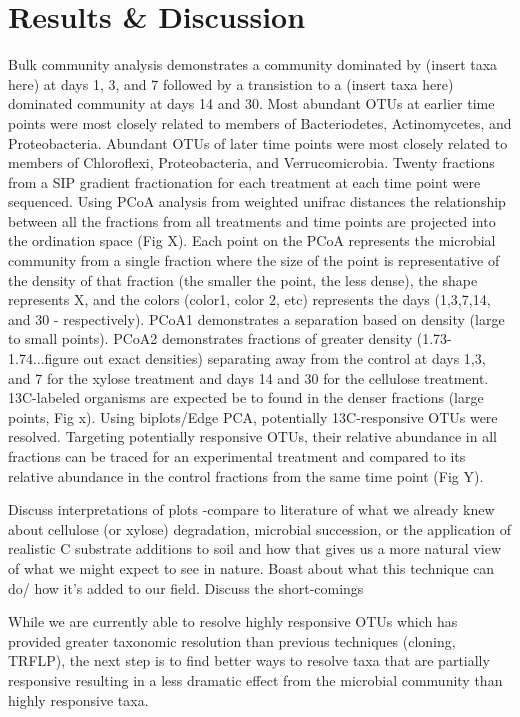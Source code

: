 \section{Results & Discussion}


Bulk community analysis demonstrates a community dominated by (insert taxa here) at days 1, 3, and 7 followed by a transistion to a (insert taxa here) dominated community at days 14 and 30. Most abundant OTUs at earlier time points were most closely related to members of Bacteriodetes, Actinomycetes, and Proteobacteria. Abundant OTUs of later time points were most closely related to members of Chloroflexi, Proteobacteria, and Verrucomicrobia. Twenty fractions from a SIP gradient fractionation for each treatment at each time point were sequenced. Using PCoA analysis from weighted unifrac distances the relationship between all the fractions from all treatments and time points are projected into the ordination space (Fig X). Each point on the PCoA represents the microbial community from a single fraction where the size of the point is representative of the density of that fraction (the smaller the point, the less dense), the shape represents X, and the colors (color1, color 2, etc) represents the days (1,3,7,14, and 30 - respectively). PCoA1 demonstrates a separation based on density (large to small points). PCoA2 demonstrates fractions of greater density (1.73-1.74...figure out exact densities) separating away from the control at days 1,3, and 7 for the xylose treatment and days 14 and 30 for the cellulose treatment. 13C-labeled organisms are expected be to found in the denser fractions (large points, Fig x). Using biplots/Edge PCA, potentially 13C-responsive OTUs were resolved.  Targeting potentially responsive OTUs, their relative abundance in all fractions can be traced for an experimental treatment and compared to its relative abundance in the control fractions from the same time point (Fig Y).       
          

 

Discuss interpretations of plots
    -compare to literature of what we already knew about cellulose (or xylose) degradation, microbial succession, or the application of realistic C substrate additions to soil and how that gives us a more natural view of what we might expect to see in nature.  
Boast about what this technique can do/ how it's added to our field.
Discuss the short-comings


While we are currently able to resolve highly responsive OTUs which has provided greater taxonomic resolution than previous techniques (cloning, TRFLP), the next step is to find better ways to resolve taxa that are partially responsive resulting in a less dramatic effect from the microbial community than highly responsive taxa.  


